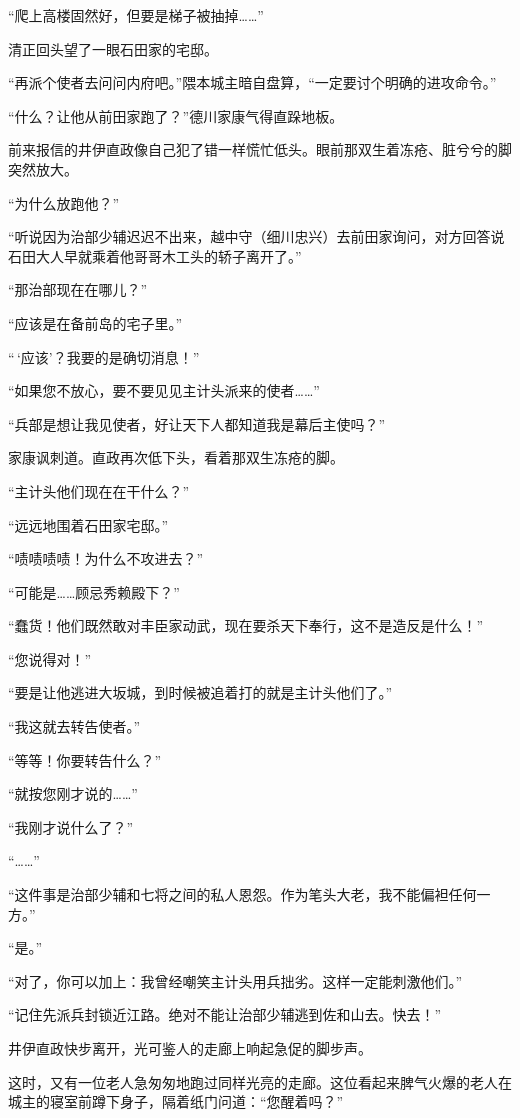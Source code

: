 \documentclass[
]{book}
\begin{document}
``爬上高楼固然好，但要是梯子被抽掉\ldots\ldots{}''

清正回头望了一眼石田家的宅邸。

``再派个使者去问问内府吧。''隈本城主暗自盘算，``一定要讨个明确的进攻命令。''

``什么？让他从前田家跑了？''德川家康气得直跺地板。

前来报信的井伊直政像自己犯了错一样慌忙低头。眼前那双生着冻疮、脏兮兮的脚突然放大。

``为什么放跑他？''

``听说因为治部少辅迟迟不出来，越中守（细川忠兴）去前田家询问，对方回答说石田大人早就乘着他哥哥木工头的轿子离开了。''

``那治部现在在哪儿？''

``应该是在备前岛的宅子里。''

``\,`应该'？我要的是确切消息！''

``如果您不放心，要不要见见主计头派来的使者\ldots\ldots{}''

``兵部是想让我见使者，好让天下人都知道我是幕后主使吗？''

家康讽刺道。直政再次低下头，看着那双生冻疮的脚。

``主计头他们现在在干什么？''

``远远地围着石田家宅邸。''

``啧啧啧啧！为什么不攻进去？''

``可能是\ldots\ldots 顾忌秀赖殿下？''

``蠢货！他们既然敢对丰臣家动武，现在要杀天下奉行，这不是造反是什么！''

``您说得对！''

``要是让他逃进大坂城，到时候被追着打的就是主计头他们了。''

``我这就去转告使者。''

``等等！你要转告什么？''

``就按您刚才说的\ldots\ldots{}''

``我刚才说什么了？''

``\ldots\ldots{}''

``这件事是治部少辅和七将之间的私人恩怨。作为笔头大老，我不能偏袒任何一方。''

``是。''

``对了，你可以加上：我曾经嘲笑主计头用兵拙劣。这样一定能刺激他们。''

``记住先派兵封锁近江路。绝对不能让治部少辅逃到佐和山去。快去！''

井伊直政快步离开，光可鉴人的走廊上响起急促的脚步声。

这时，又有一位老人急匆匆地跑过同样光亮的走廊。这位看起来脾气火爆的老人在城主的寝室前蹲下身子，隔着纸门问道：``您醒着吗？''
\end{document}
